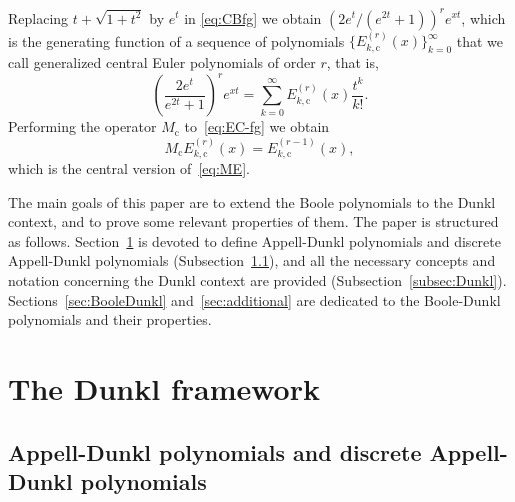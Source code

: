 \documentclass[11pt]{article}
\theoremstyle{plain}
\theoremstyle{remark}
\numberwithin{equation}{section} %
\begin{document}
Replacing $t+\sqrt{1+t^2}$ by $e^t$ in \eqref{eq:CBfg} we obtain $(2e^{t}/(e^{2t}+1))^re^{xt}$, which is the generating function of a sequence of polynomials $\{E^{(r)}_{k,\mathrm{c}}(x)\}_{k=0}^\infty$ that we call generalized central Euler polynomials of order $r$, that is,
\begin{equation}
\label{eq:EC-fg}
  \left(\frac{2e^{t}}{e^{2t}+1}\right)^r e^{xt}
  = \sum_{k=0}^{\infty} E^{(r)}_{k,\mathrm{c}}(x)\frac{t^k}{k!}.
\end{equation}
Performing the operator $M_{\mathrm{c}}$ to~\eqref{eq:EC-fg} we obtain
\begin{equation}
\label{eq:McEg}
  M_{\mathrm{c}}E^{(r)}_{k,\mathrm{c}}(x) = E^{(r-1)}_{k,\mathrm{c}}(x),
\end{equation}
which is the central version of~\eqref{eq:ME}.

The main goals of this paper are to extend the Boole polynomials to the Dunkl context, and to prove some relevant properties of them. The paper is structured as follows. Section~\ref{sec:Dunkl} is devoted to define Appell-Dunkl polynomials and discrete Appell-Dunkl polynomials (Subsection~\ref{subsec:AD}), and all the necessary concepts and notation concerning the Dunkl context are provided (Subsection~\ref{subsec:Dunkl}). Sections~\ref{sec:BooleDunkl} and~\ref{sec:additional} are dedicated to the Boole-Dunkl polynomials and their properties.

\section{The Dunkl framework}
\label{sec:Dunkl}

\subsection{Appell-Dunkl polynomials and discrete Appell-Dunkl polynomials}
\label{subsec:AD}
\end{document}
